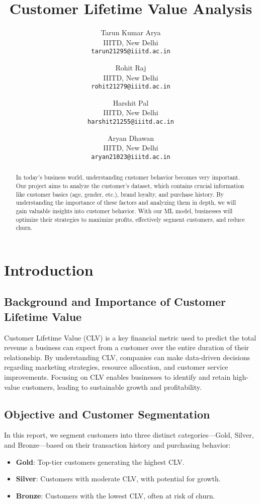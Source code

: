 \documentclass{article}
\title{Customer Lifetime Value Analysis}
\author{
  Tarun Kumar Arya \\
  IIITD, New Delhi \\
  \texttt{tarun21295@iiitd.ac.in}
  \and
  Rohit Raj \\
  IIITD, New Delhi \\
  \texttt{rohit21279@iiitd.ac.in}
  \and
  Harshit Pal \\
  IIITD, New Delhi \\
  \texttt{harshit21255@iiitd.ac.in}
  \and
  Aryan Dhawan \\
  IIITD, New Delhi \\
  \texttt{aryan21023@iiitd.ac.in}
}
\date{}
\begin{document}
\maketitle

\begin{abstract}
In today’s business world, understanding customer behavior becomes very important. Our project aims to analyze the customer's dataset, which contains crucial information like customer basics (age, gender, etc.), brand loyalty, and purchase history. By understanding the importance of these factors and analyzing them in depth, we will gain valuable insights into customer behavior. With our ML model, businesses will optimize their strategies to maximize profits, effectively segment customers, and reduce churn.
\end{abstract}

\section{Introduction}

\subsection{Background and Importance of Customer Lifetime Value}
Customer Lifetime Value (CLV) is a key financial metric used to predict the total revenue a business can expect from a customer over the entire duration of their relationship. By understanding CLV, companies can make data-driven decisions regarding marketing strategies, resource allocation, and customer service improvements. Focusing on CLV enables businesses to identify and retain high-value customers, leading to sustainable growth and profitability.

\subsection{Objective and Customer Segmentation}
In this report, we segment customers into three distinct categories—Gold, Silver, and Bronze—based on their transaction history and purchasing behavior:
\begin{itemize}
    \item \textbf{Gold}: Top-tier customers generating the highest CLV.
    \item \textbf{Silver}: Customers with moderate CLV, with potential for growth.
    \item \textbf{Bronze}: Customers with the lowest CLV, often at risk of churn.
\end{itemize}
\end{document}
